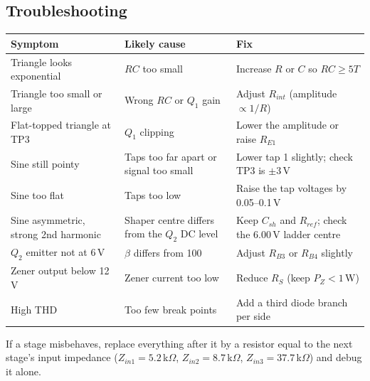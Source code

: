 \subsection{Troubleshooting}
\begin{center}
\small
\begin{tabularx}{\textwidth}{@{}>{\raggedright}p{4.1cm}>{\raggedright}p{4.4cm}X@{}}
\toprule
Symptom & Likely cause & Fix \\
\midrule
Triangle looks exponential & $RC$ too small & Increase $R$ or $C$ so $RC\ge5T$ \\
Triangle too small or large & Wrong $RC$ or $Q_1$ gain & Adjust $R_{int}$ (amplitude $\propto1/R$) \\
Flat-topped triangle at TP3 & $Q_1$ clipping & Lower the amplitude or raise $R_{E1}$ \\
Sine still pointy & Taps too far apart or signal too small & Lower tap 1 slightly; check TP3 is $\pm3$\,V \\
Sine too flat & Taps too low & Raise the tap voltages by 0.05--0.1\,V \\
Sine asymmetric, strong 2nd harmonic & Shaper centre differs from the $Q_2$ DC level & Keep $C_{sh}$ and $R_{ref}$; check the 6.00\,V ladder centre \\
$Q_2$ emitter not at 6\,V & $\beta$ differs from 100 & Adjust $R_{B3}$ or $R_{B4}$ slightly \\
Zener output below 12\,V & Zener current too low & Reduce $R_S$ (keep $P_Z<1$\,W) \\
High THD & Too few break points & Add a third diode branch per side \\
\bottomrule
\end{tabularx}
\end{center}
If a stage misbehaves, replace everything after it by a resistor equal to the next stage's input impedance ($Z_{in1}=5.2$\,k$\Omega$, $Z_{in2}=8.7$\,k$\Omega$, $Z_{in3}=37.7$\,k$\Omega$) and debug it alone.

